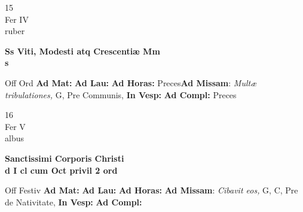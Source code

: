 \documentclass[10pt, openany]{book}
\begin{document}
        \begin{center}
            \begin{minipage}{3.5in}
                \vspace{2em}
                \begin{minipage}{0.5in}
                    {\Huge 15} \\
                    {\normalsize Fer IV} \\
                    {\normalsize ruber}
                \end{minipage}
                \begin{minipage}{3.0in}
                    \textbf{ \large Ss Viti, Modesti atq Crescentiæ Mm \\
                    \textnormal{\normalsize s}} \\ 
                \end{minipage}
                \begin{justify}Off Ord
                    \textbf{Ad Mat: }
                    \textbf{Ad Lau: }
                    \textbf{Ad Horas: }Preces\textbf{Ad Missam}: \textit{Multæ tribulationes,} G, Pre Communis,  
                    \textbf{In Vesp: }
                    \textbf{Ad Compl: }Preces
                \end{justify}
            \end{minipage}
        \end{center}
    
        \begin{center}
            \begin{minipage}{3.5in}
                \vspace{2em}
                \begin{minipage}{0.5in}
                    {\Huge 16} \\
                    {\normalsize Fer V} \\
                    {\normalsize albus}
                \end{minipage}
                \begin{minipage}{3.0in}
                    \textbf{ \large Sanctissimi Corporis Christi \\
                    \textnormal{\normalsize d I cl cum Oct privil 2 ord}} \\ 
                \end{minipage}
                \begin{justify}Off Festiv
                    \textbf{Ad Mat: }
                    \textbf{Ad Lau: }
                    \textbf{Ad Horas: }\textbf{Ad Missam}: \textit{Cibavit eos,} G, C, Pre de Nativitate,  
                    \textbf{In Vesp: }
                    \textbf{Ad Compl: }
                \end{justify}
            \end{minipage}
        \end{center}
    
\end{document}
